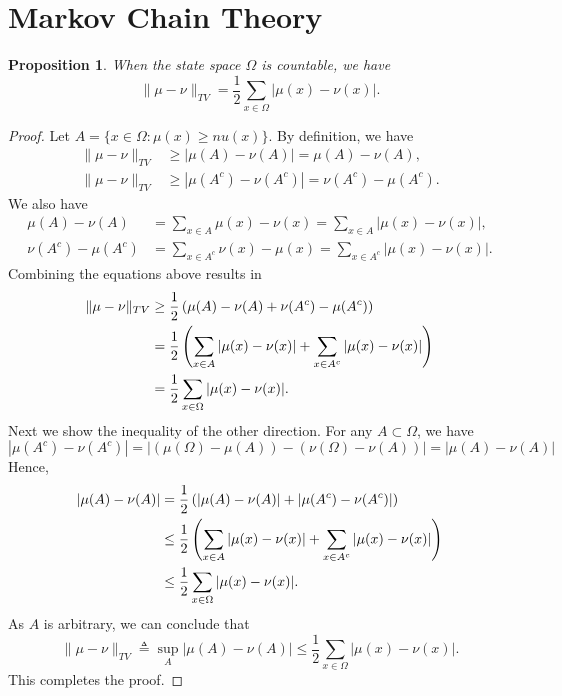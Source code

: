 \documentclass[a4paper,11pt]{article}
\newtheorem{proposition}{Proposition}
\begin{document}
\section{Markov Chain Theory}

\begin{proposition}
    When the state space $\Omega$ is countable, we have
    \begin{equation}
        \|\mu - \nu\|_{TV} = \frac{1}{2} \sum_{x \in \Omega} |\mu(x) - \nu(x) |.
    \end{equation}
\end{proposition}

\begin{proof}
    Let $A = \{x \in \Omega: \mu(x) \ge nu(x) \}$. By definition, we have 
    \begin{align}
        \|\mu - \nu\|_{TV} &\ge |\mu(A) - \nu(A)| = \mu(A) - \nu(A), \\
        \|\mu - \nu\|_{TV} &\ge |\mu(A^c) - \nu(A^c)| = \nu(A^c) - \mu(A^c). 
    \end{align}
    We also have 
    \begin{align}
        \mu(A) - \nu(A) &= \sum_{x \in A} \mu(x) - \nu(x) = \sum_{x \in A} |\mu(x) - \nu(x)|, \\
        \nu(A^c) - \mu(A^c) &= \sum_{x \in A^c} \nu(x) - \mu(x) = \sum_{x \in A^c} |\mu(x) - \nu(x) |.
    \end{align}
    Combining the equations above results in
    \begin{align}
        \|\mu - \nu\|_{TV} 
        &\ge \frac{1}{2} \left(\mu(A) - \nu(A) + \nu(A^c) - \mu(A^c)\right) \notag \\
        &= \frac{1}{2} \left( \sum_{x \in A} |\mu(x) - \nu(x)| + \sum_{x \in A^c} |\mu(x) - \nu(x) | \right) \notag \\
        &= \frac{1}{2} \sum_{x \in \Omega} |\mu(x) - \nu(x)|.
    \end{align}
    Next we show the inequality of the other direction. For any $A \subset \Omega$, we have
    \begin{equation}
        |\mu(A^c) - \nu(A^c)| = \left|(\mu(\Omega) - \mu(A)) - (\nu(\Omega) - \nu(A))\right| = |\mu(A) - \nu(A)|
    \end{equation}
    Hence,
    \begin{align}
        |\mu(A) - \nu(A)|
        &= \frac{1}{2} \left( |\mu(A) - \nu(A)| + |\mu(A^c) - \nu(A^c)| \right) \notag \\
        &\le \frac{1}{2} \left( \sum_{x \in A} |\mu(x) - \nu(x) | + \sum_{x \in A^c} |\mu(x) - \nu(x) | \right) \notag \\
        &\le \frac{1}{2} \sum_{x \in \Omega} |\mu(x) - \nu(x) |.
    \end{align}
    As $A$ is arbitrary, we can conclude that
    \begin{equation}
        \|\mu - \nu\|_{TV} \triangleq \sup_{A} |\mu(A) - \nu(A)| \le \frac{1}{2} \sum_{x \in \Omega} |\mu(x) - \nu(x)|.
    \end{equation}
    This completes the proof.
\end{proof}
\end{document}
